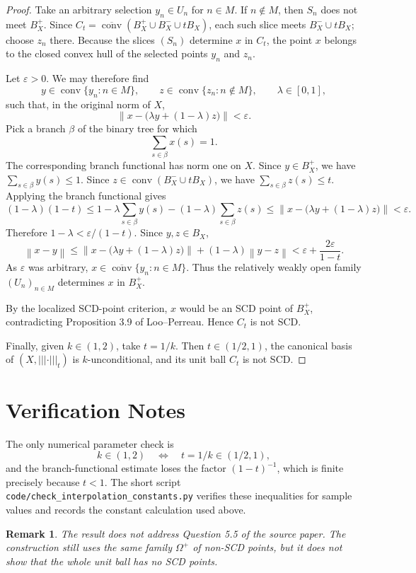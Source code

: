 \documentclass[11pt]{article}
\newtheorem{remark}{Remark}
\newcommand{\Ball}{B}
\newcommand{\conv}{\operatorname{conv}}
\newcommand{\wclosedconv}{\overline{\operatorname{conv}}}
\newcommand{\norm}[1]{\left\lVert #1 \right\rVert}
\newcommand{\vertiii}[1]{\left|\!\left|\!\left| #1 \right|\!\right|\!\right|}
\begin{document}
\begin{proof}
Take an arbitrary selection $y_n\in U_n$ for $n\in M$. If $n\notin M$,
then $S_n$ does not meet $\Ball_X^+$. Since
$C_t=\wclosedconv(\Ball_X^+\cup\Ball_X^-\cup t\Ball_X)$, each such slice
meets $\Ball_X^-\cup t\Ball_X$; choose $z_n$ there. Because the slices
$(S_n)$ determine $x$ in $C_t$, the point $x$ belongs to the closed convex
hull of the selected points $y_n$ and $z_n$.

Let $\varepsilon>0$. We may therefore find
\[
  y\in\conv\{y_n:n\in M\},\qquad
  z\in\conv\{z_n:n\notin M\},\qquad
  \lambda\in[0,1],
\]
such that, in the original norm of $X$,
\[
  \norm{x-\bigl(\lambda y+(1-\lambda)z\bigr)}<\varepsilon.
\]
Pick a branch $\beta$ of the binary tree for which
\[
  \sum_{s\in\beta} x(s)=1.
\]
The corresponding branch functional has norm one on $X$. Since
$y\in\Ball_X^+$, we have $\sum_{s\in\beta}y(s)\le 1$. Since
$z\in\conv(\Ball_X^-\cup t\Ball_X)$, we have
$\sum_{s\in\beta}z(s)\le t$. Applying the branch functional gives
\[
  (1-\lambda)(1-t)
  \le
  1-\lambda\sum_{s\in\beta}y(s)
    -(1-\lambda)\sum_{s\in\beta}z(s)
  \le
  \norm{x-\bigl(\lambda y+(1-\lambda)z\bigr)}
  < \varepsilon.
\]
Therefore $1-\lambda<\varepsilon/(1-t)$. Since $y,z\in\Ball_X$,
\[
  \norm{x-y}
  \le
  \norm{x-\bigl(\lambda y+(1-\lambda)z\bigr)}
  +(1-\lambda)\norm{y-z}
  <
  \varepsilon+\frac{2\varepsilon}{1-t}.
\]
As $\varepsilon$ was arbitrary,
$x\in\wclosedconv\{y_n:n\in M\}$. Thus the relatively weakly open family
$(U_n)_{n\in M}$ determines $x$ in $\Ball_X^+$.

By the localized SCD-point criterion, $x$ would be an SCD point of
$\Ball_X^+$, contradicting Proposition 3.9 of Loo--Perreau. Hence $C_t$ is
not SCD.

Finally, given $k\in(1,2)$, take $t=1/k$. Then $t\in(1/2,1)$, the canonical
basis of $(X,\vertiii{\cdot}_t)$ is $k$-unconditional, and its unit ball
$C_t$ is not SCD.
\end{proof}

\section*{Verification Notes}

The only numerical parameter check is
\[
  k\in(1,2)\quad\Longleftrightarrow\quad t=1/k\in(1/2,1),
\]
and the branch-functional estimate loses the factor $(1-t)^{-1}$, which is
finite precisely because $t<1$. The short script
\texttt{code/check\_interpolation\_constants.py} verifies these inequalities
for sample values and records the constant calculation used above.

\begin{remark}
The result does not address Question 5.5 of the source paper. The
construction still uses the same family $\Omega^+$ of non-SCD points, but
it does not show that the whole unit ball has no SCD points.
\end{remark}
\end{document}
